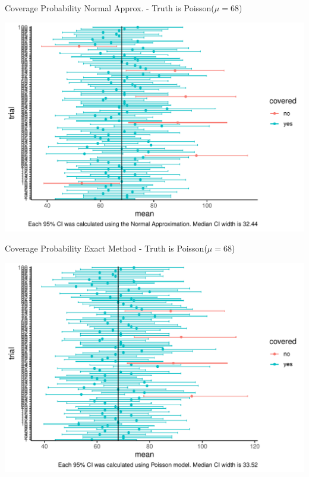 \documentclass[10pt]{beamer}\usepackage[]{graphicx}\usepackage[]{color}
\makeatletter
\def\maxwidth{ %
  \ifdim\Gin@nat@width>\linewidth
    \linewidth
  \else
    \Gin@nat@width
  \fi
}
\newenvironment{knitrout}{}{} %
\makeatother
\begin{document}
\begin{frame}[fragile]{Coverage Probability Normal Approx. - Truth is Poisson($\mu=68$)}
	
\begin{knitrout}\tiny
{}\color{fgcolor}

{\centering \includegraphics[width=\maxwidth]{figure/unnamed-chunk-7-1} 

}


\end{knitrout}
	
\end{frame}



\begin{frame}[fragile]{Coverage Probability Exact Method - Truth is Poisson($\mu=68$)}
	
\begin{knitrout}\tiny
{}\color{fgcolor}

{\centering \includegraphics[width=\maxwidth]{figure/unnamed-chunk-8-1} 

}


\end{knitrout}
	
\end{frame}
\end{document}
